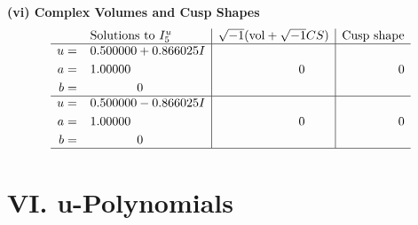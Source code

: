 \documentclass[1p]{elsarticle_modified}
\theoremstyle{definition}
\newcommand{\I}{\sqrt{-1}}
\begin{document}
\newpage\flushleft \textbf{(vi) Complex Volumes and Cusp Shapes}
$$\begin{array}{c|c|c}  
\text{Solutions to }I^u_{5}& \I (\text{vol} + \sqrt{-1}CS) & \text{Cusp shape}\\
 \hline 
\begin{aligned}
u &= \phantom{-}0.500000 + 0.866025 I \\
a &= \phantom{-}1.00000\phantom{ +0.000000I} \\
b &= \phantom{-0.000000 } 0\end{aligned}
 & \phantom{-0.000000 } 0 & \phantom{-0.000000 } 0 \\ \hline\begin{aligned}
u &= \phantom{-}0.500000 - 0.866025 I \\
a &= \phantom{-}1.00000\phantom{ +0.000000I} \\
b &= \phantom{-0.000000 } 0\end{aligned}
 & \phantom{-0.000000 } 0 & \phantom{-0.000000 } 0\\
 \hline 
 \end{array}$$\newpage
\newpage\renewcommand{\arraystretch}{1}
\centering \section*{ VI. u-Polynomials}
\end{document}
